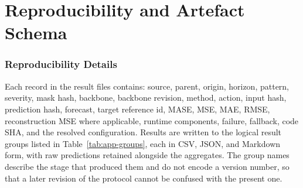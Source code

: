 \documentclass{article}
\begin{document}
\section{Reproducibility and Artefact Schema}
\label{app:repro-full}
\subsubsection{Reproducibility Details}
\label{app:reprodetails}
Each record in the result files contains: source, parent, origin, horizon, pattern,
severity, mask hash, backbone, backbone revision, method, action, input hash, prediction
hash, forecast, target reference id, MASE, MSE, MAE, RMSE, reconstruction MSE where
applicable, runtime components, failure, fallback, code SHA, and the resolved configuration.
Results are written to the logical result groups listed in Table~\ref{tab:app-groups}, each in
CSV, JSON, and Markdown form, with raw predictions retained alongside the aggregates. The
group names describe the stage that produced them and do not encode a version number, so that
a later revision of the protocol cannot be confused with the present one.
\end{document}
